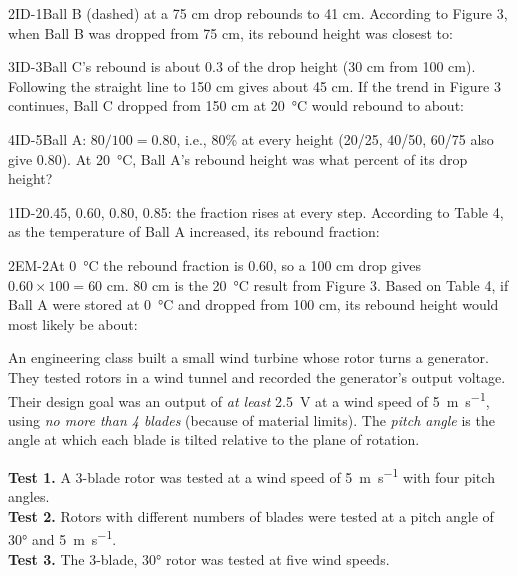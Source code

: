 \documentclass[11pt]{article}
\begin{document}
\begin{q}{2}{ID-1}{Ball B (dashed) at a 75 cm drop rebounds to 41 cm.}
According to Figure 3, when Ball B was dropped from 75 cm, its rebound height was closest to:
\choicesrow{23 cm}{41 cm}{55 cm}{60 cm}
\end{q}

\begin{q}{3}{ID-3}{Ball C's rebound is about 0.3 of the drop height (30 cm from 100 cm). Following the straight line to 150 cm gives about 45 cm.}
If the trend in Figure 3 continues, Ball C dropped from 150 cm at \SI{20}{\celsius} would rebound to about:
\choicesrow{15 cm}{30 cm}{45 cm}{60 cm}
\end{q}

\begin{q}{4}{ID-5}{Ball A: $80/100 = 0.80$, i.e., 80\% at every height (20/25, 40/50, 60/75 also give 0.80).}
At \SI{20}{\celsius}, Ball A's rebound height was what percent of its drop height?
\end{q}

\begin{q}{1}{ID-2}{0.45, 0.60, 0.80, 0.85: the fraction rises at every step.}
According to Table 4, as the temperature of Ball A increased, its rebound fraction:
\end{q}

\begin{q}{2}{EM-2}{At \SI{0}{\celsius} the rebound fraction is 0.60, so a 100 cm drop gives $0.60 \times 100 = 60$ cm. 80 cm is the \SI{20}{\celsius} result from Figure 3.}
Based on Table 4, if Ball A were stored at \SI{0}{\celsius} and dropped from 100 cm, its rebound height would most likely be about:
\choicesrow{45 cm}{60 cm}{80 cm}{85 cm}
\end{q}

An engineering class built a small wind turbine whose rotor turns a generator. They tested rotors in a wind tunnel and recorded the generator's output voltage. Their design goal was an output of \emph{at least} \SI{2.5}{\volt} at a wind speed of \SI{5}{\metre\per\second}, using \emph{no more than 4 blades} (because of material limits). The \emph{pitch angle} is the angle at which each blade is tilted relative to the plane of rotation.

\textbf{Test 1.} A 3-blade rotor was tested at a wind speed of \SI{5}{\metre\per\second} with four pitch angles.\\
\textbf{Test 2.} Rotors with different numbers of blades were tested at a pitch angle of \ang{30} and \SI{5}{\metre\per\second}.\\
\textbf{Test 3.} The 3-blade, \ang{30} rotor was tested at five wind speeds.
\end{document}
